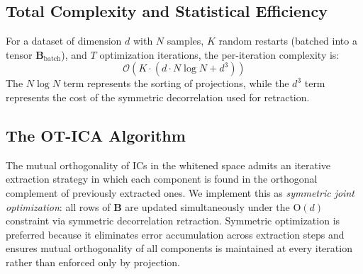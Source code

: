 \documentclass{tpm2026} %
\begin{document}
\subsection{Total Complexity and Statistical Efficiency}
For a dataset of dimension $d$ with $N$ samples, $K$ random restarts (batched into a tensor $\mathbf{B}_{\text{batch}}$), and $T$ optimization iterations, the per-iteration complexity is:
\begin{equation}
    \mathcal{O}(K \cdot (d \cdot N \log N + d^3))
\end{equation}
The $N \log N$ term represents the sorting of projections, while the $d^3$ term represents the cost of the symmetric decorrelation used for retraction.

\subsection{The OT-ICA Algorithm}

The mutual orthogonality of ICs in the whitened space admits an iterative extraction strategy in which each component is found in the orthogonal complement of previously extracted ones.
We implement this as \emph{symmetric joint optimization}: all rows of $\mathbf{B}$ are updated simultaneously under the $\mathrm{O}(d)$ constraint via symmetric decorrelation retraction.
Symmetric optimization is preferred because it eliminates error accumulation across extraction steps and ensures mutual orthogonality of all components is maintained at every iteration rather than enforced only by projection.
\end{document}
